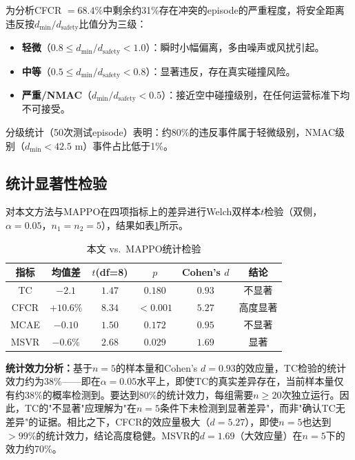 \documentclass[12pt,a4paper,UTF8]{ctexart}
\begin{document}
为分析CFCR $=68.4\%$中剩余约31\%存在冲突的episode的严重程度，将安全距离违反按$d_{\min}/d_{\text{safety}}$比值分为三级：

\begin{itemize}
    \item \textbf{轻微}（$0.8 \leq d_{\min}/d_{\text{safety}} < 1.0$）：瞬时小幅偏离，多由噪声或风扰引起。
    \item \textbf{中等}（$0.5 \leq d_{\min}/d_{\text{safety}} < 0.8$）：显著违反，存在真实碰撞风险。
    \item \textbf{严重/NMAC}（$d_{\min}/d_{\text{safety}} < 0.5$）：接近空中碰撞级别，在任何运营标准下均不可接受。
\end{itemize}

分级统计（50次测试episode）表明：约80\%的违反事件属于轻微级别，NMAC级别（$d_{\min} < 42.5$ m）事件占比低于1\%。

\subsection{统计显著性检验}

对本文方法与MAPPO在四项指标上的差异进行Welch双样本$t$检验（双侧，$\alpha=0.05$，$n_1=n_2=5$），结果如表\ref{tab:ttest}所示。

\begin{table}[H]
    \centering
    \caption{本文 vs.\ MAPPO统计检验}
    \label{tab:ttest}
    \begin{tabular}{|c|c|c|c|c|c|}
        \hline
        \textbf{指标} & \textbf{均值差} & \textbf{$t$(df=8)} & \textbf{$p$} & \textbf{Cohen's $d$} & \textbf{结论} \\
        \hline
        TC & $-2.1$ & $1.47$ & $0.180$ & $0.93$ & 不显著 \\
        CFCR & $+10.6\%$ & $8.34$ & $<0.001$ & $5.27$ & 高度显著 \\
        MCAE & $-0.10$ & $1.50$ & $0.172$ & $0.95$ & 不显著 \\
        MSVR & $-0.6\%$ & $2.68$ & $0.029$ & $1.69$ & 显著 \\
        \hline
    \end{tabular}
\end{table}

\textbf{统计效力分析：}基于$n=5$的样本量和Cohen's $d=0.93$的效应量，TC检验的统计效力约为38\%——即在$\alpha=0.05$水平上，即使TC的真实差异存在，当前样本量仅有约38\%的概率检测到。要达到80\%的统计效力，每组需要$n \geq 20$次独立运行。因此，TC的"不显著"应理解为"在$n=5$条件下未检测到显著差异"，而非"确认TC无差异"的证据。相比之下，CFCR的效应量极大（$d=5.27$），即使$n=5$也达到$>99\%$的统计效力，结论高度稳健。MSVR的$d=1.69$（大效应量）在$n=5$下的效力约70\%。
\end{document}

